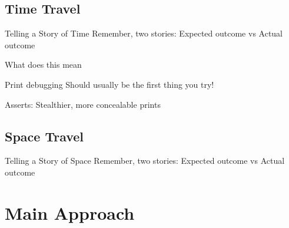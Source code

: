 \documentclass[xcolor=dvipsnames]{beamer}
\begin{document}
\subsection{Time Travel}


\begin{frame}{Telling a Story of Time}
	Remember, two stories: Expected outcome vs Actual outcome

	\linegap
	What does this mean 
\end{frame}

\begin{frame}{Print debugging}
	Should usually be the first thing you try!
\end{frame}

\begin{frame}{Asserts: Stealthier, more concealable prints}
\end{frame}

\subsection{Space Travel}


\begin{frame}{Telling a Story of Space}
	Remember, two stories: Expected outcome vs Actual outcome

	\linegap
\end{frame}

\section{Main Approach}
\end{document}

